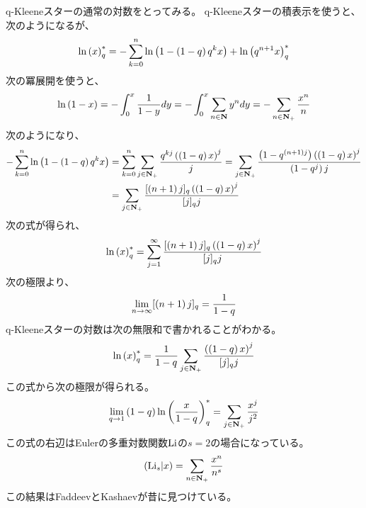 {	q-Kleeneスターの通常の対数をとってみる。
	q-Kleeneスターの積表示を使うと、次のようになるが、
	\begin{equation*}\begin{split}
		\ln\mathinner{\left({x}\right)}_q^* = - \sum_{k=0}^n \ln\mathinner{\left({1 - \mathinner{\left({1 - q}\right)}q^kx}\right)} 
			+ \ln\mathinner{\left({q^{n+1}x}\right)}_q^*
	\end{split}\end{equation*}
	次の冪展開を使うと、
	\begin{equation*}\begin{split}
		\ln\mathinner{\left({1 - x}\right)} = - \int_0^x \frac{1}{1 - y} dy
		= - \int_0^x \sum_{n\in\mathbf{N}} y^n dy
		= - \sum_{n\in\mathbf{N}_+} \frac{x^n}{n}
	\end{split}\end{equation*}
	次のようになり、
	\begin{equation*}\begin{split}
		- \sum_{k=0}^n \ln\mathinner{\left({1 - \mathinner{\left({1 - q}\right)}q^kx}\right)}
		&= \sum_{k=0}^n\sum_{j\in\mathbf{N}_+} \frac{q^{kj}\mathinner{\left({\mathinner{\left({1 - q}\right)}x}\right)}^j}{j}
		= \sum_{j\in\mathbf{N}_+} \frac{\mathinner{\left({1 - q^{\mathinner{\left({n + 1}\right)}j}}\right)}\mathinner{\left({\mathinner{\left({1 - q}\right)}x}\right)}^j}
			{\mathinner{\left({1 - q^j}\right)}j} \\
		&= \sum_{j\in\mathbf{N}_+} \frac{[\mathinner{\left({n + 1}\right)}j]_q\mathinner{\left({\mathinner{\left({1 - q}\right)}x}\right)}^j}{[j]_qj}
	\end{split}\end{equation*}
	次の式が得られ、
	\begin{equation*}\begin{split}
		\ln\mathinner{\left({x}\right)}_q^* = \sum_{j=1}^\infty 
			\frac{[\mathinner{\left({n + 1}\right)}j]_q\mathinner{\left({\mathinner{\left({1 - q}\right)}x}\right)}^j}{[j]_qj}
	\end{split}\end{equation*}
	次の極限より、
	\begin{equation*}\begin{split}
		\lim_{n\to\infty}[\mathinner{\left({n + 1}\right)}j]_q = \frac{1}{1 - q}
	\end{split}\end{equation*}
	q-Kleeneスターの対数は次の無限和で書かれることがわかる。
	\begin{equation*}\begin{split}
		\ln\mathinner{\left({x}\right)}_q^* = \frac{1}{1 - q}
		\sum_{j\in\mathbf{N}_+} \frac{\mathinner{\left({\mathinner{\left({1 - q}\right)}x}\right)}^j}{[j]_qj}
	\end{split}\end{equation*}
	この式から次の極限が得られる。
	\begin{equation*}\begin{split}
		\lim_{q\to1} \mathinner{\left({1-q}\right)}\ln\mathinner{\left({\frac{x}{1 - q}}\right)}_q^*
		= \sum_{j\in\mathbf{N}_+} \frac{x^j}{j^2}
	\end{split}\end{equation*}
	この式の右辺はEulerの多重対数関数${\operatorname{Li}}$の$s=2$の場合になっている。
	\begin{equation*}\begin{split}
		\mathinner{\left({{\ensuremath{\operatorname{Li}}}_s|x}\right)} = \sum_{n\in\mathbf{N}_+} \frac{x^n}{n^s}
	\end{split}\end{equation*}
	この結果はFaddeevとKashaevが昔に見つけている\cite{Faddeev:1993rs}。
}
